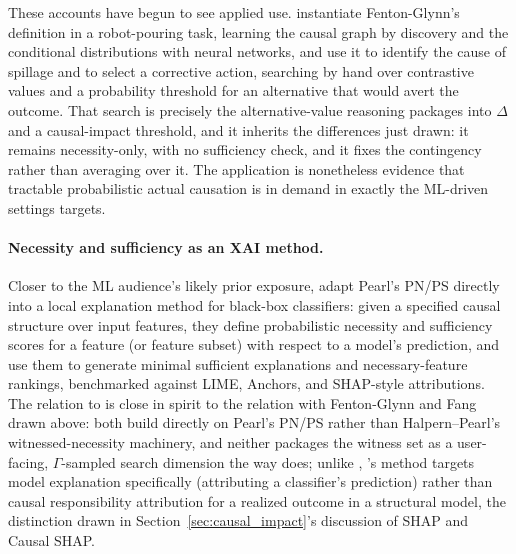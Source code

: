 These accounts have begun to see applied use. \citet{maldonado2025robot} instantiate
Fenton-Glynn's definition in a robot-pouring task, learning the causal graph by
discovery and the conditional distributions with neural networks, and use it to
identify the cause of spillage and to select a corrective action, searching by hand
over contrastive values and a probability threshold for an alternative that would avert
the outcome. That search is precisely the alternative-value reasoning \ourapproach
packages into $\Delta$ and a causal-impact threshold, and it inherits the differences
just drawn: it remains necessity-only, with no sufficiency check, and it fixes the
contingency rather than averaging over it. The application is nonetheless evidence that
tractable probabilistic actual causation is in demand in exactly the ML-driven settings
\ourapproach targets.

\paragraph{Necessity and sufficiency as an XAI method.}
Closer to the ML audience's likely prior exposure, \citet{watson2021necessity} adapt
Pearl's PN/PS directly into a local explanation method for black-box classifiers:
given a specified causal structure over input features, they define probabilistic
necessity and sufficiency scores for a feature (or feature subset) with respect to a
model's prediction, and use them to generate minimal sufficient explanations and
necessary-feature rankings, benchmarked against LIME, Anchors, and SHAP-style
attributions. The relation to \ourapproach is close in spirit to the relation with
Fenton-Glynn and Fang drawn above: both build directly on Pearl's PN/PS rather than
Halpern--Pearl's witnessed-necessity machinery, and neither packages the witness set
as a user-facing, $\Gamma$-sampled search dimension the way \ourapproach does; unlike
\ourapproach, \citeauthor{watson2021necessity}'s method targets model explanation
specifically (attributing a classifier's prediction) rather than causal responsibility
attribution for a realized outcome in a structural model, the distinction drawn in
Section~\ref{sec:causal_impact}'s discussion of SHAP and Causal SHAP.

